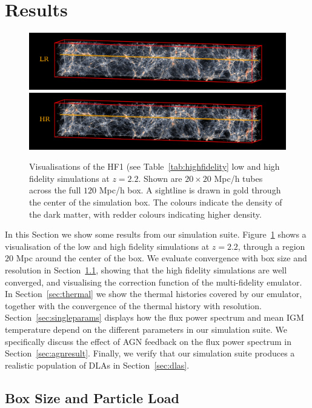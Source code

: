 \documentclass[a4paper,11pt]{article}
\begin{document}
\section{Results}
\begin{figure}
\includegraphics[width=1.0\textwidth]{figures/lr_lya_tube_20mpc.pdf}
\includegraphics[width=1.0\textwidth]{figures/hr_lya_tube_20mpc.pdf}
 \caption{Visualisations of the HF1 (see Table~\protect\ref{tab:highfidelity} low and high fidelity simulations at $z=2.2$. Shown are $20\times 20$ Mpc/h tubes across the full $120$ Mpc/h box. A sightline is drawn in gold through the center of the simulation box. The colours indicate the density of the dark matter, with redder colours indicating higher density.}
 \label{fig:visualisation}
\end{figure}

In this Section we show some results from our simulation suite. Figure~\ref{fig:visualisation} shows a visualisation of the low and high fidelity simulations at $z=2.2$, through a region $20$ Mpc around the center of the box. We evaluate convergence with box size and resolution in Section~\ref{sec:boxsize}, showing that the high fidelity simulations are well converged, and visualising the correction function of the multi-fidelity emulator. In Section~\ref{sec:thermal} we show the thermal histories covered by our emulator, together with the convergence of the thermal history with resolution. Section~\ref{sec:singleparams} displays how the flux power spectrum and mean IGM temperature depend on the different parameters in our simulation suite. We specifically discuss the effect of AGN feedback on the flux power spectrum in Section~\ref{sec:agnresult}. Finally, we verify that our simulation suite produces a realistic population of DLAs in Section~\ref{sec:dlas}.

\subsection{Box Size and Particle Load}
\label{sec:boxsize}
\end{document}
